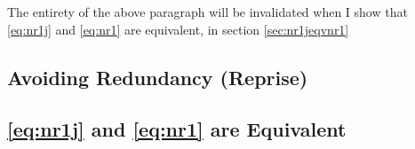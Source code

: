 \documentclass{article}
\theoremstyle{nonumberplain}
\begin{document}
The entirety of the above paragraph will be invalidated when I show that \eqref{eq:nr1j} and \eqref{eq:nr1} are equivalent, in section \ref{sec:nr1jeqvnr1}

\subsection{Avoiding Redundancy (Reprise)}



\subsection{\eqref{eq:nr1j} and \eqref{eq:nr1} are Equivalent}


%
%
\end{document}
